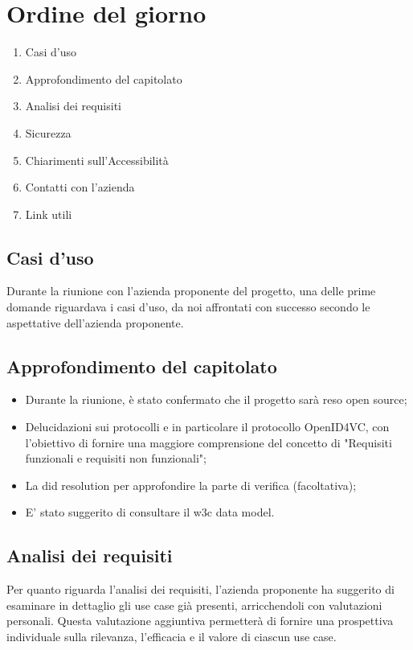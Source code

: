 \section{Ordine del giorno}
\begin{enumerate}
\item Casi d'uso
\item Approfondimento del capitolato
\item Analisi dei requisiti
\item Sicurezza
\item Chiarimenti sull'Accessibilità
\item Contatti con l'azienda 
\item Link utili
\end{enumerate}

\subsection{Casi d'uso}
Durante la riunione con l'azienda proponente del progetto, una delle prime domande riguardava i casi d'uso, da noi affrontati con successo secondo le aspettative dell'azienda proponente.


\subsection{Approfondimento del capitolato}
\begin{itemize}
    \item Durante la riunione, è stato confermato che il progetto sarà reso open source;
    \item Delucidazioni sui protocolli e in particolare il protocollo OpenID4VC, con l’obiettivo di fornire una maggiore comprensione del concetto di "Requisiti funzionali e requisiti non funzionali";
    \item La did resolution per approfondire la parte di verifica (facoltativa);
    \item E' stato suggerito di consultare il w3c data model.
\end{itemize}



\subsection{Analisi dei requisiti}
Per quanto riguarda l'analisi dei requisiti, l'azienda proponente ha suggerito di esaminare in dettaglio gli use case già presenti, arricchendoli con valutazioni personali. Questa valutazione aggiuntiva permetterà di fornire una prospettiva individuale sulla rilevanza, l'efficacia e il valore di ciascun use case.


